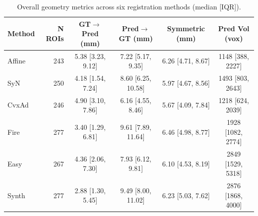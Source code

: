 \begin{table}[h]
\centering
\caption{Overall geometry metrics across six registration methods (median [IQR]).}
\label{tab:overall_geometry}
\begin{tabular}{lrcccc}
\toprule
Method & N ROIs & GT$\to$Pred (mm) & Pred$\to$GT (mm) & Symmetric (mm) & Pred Vol (vox) \\
\midrule
Affine & 243 & 5.38 [3.23, 9.12] & 7.22 [5.17, 9.35] & 6.26 [4.71, 8.67] & 1148 [388, 2227] \\
SyN & 250 & 4.18 [1.54, 7.24] & 8.60 [6.25, 10.58] & 5.97 [4.67, 8.56] & 1493 [803, 2643] \\
CvxAd & 246 & 4.90 [3.10, 7.86] & 6.16 [4.55, 8.46] & 5.67 [4.09, 7.84] & 1218 [624, 2039] \\
Fire & 277 & 3.40 [1.29, 6.81] & 9.61 [7.89, 11.64] & 6.46 [4.98, 8.77] & 1928 [1082, 2774] \\
Easy & 267 & 4.36 [2.06, 7.30] & 7.93 [6.12, 9.81] & 6.10 [4.53, 8.19] & 2849 [1529, 5318] \\
Synth & 277 & 2.88 [1.30, 5.45] & 9.49 [8.00, 11.02] & 6.23 [5.03, 7.62] & 2876 [1868, 4000] \\
\bottomrule
\end{tabular}
\end{table}